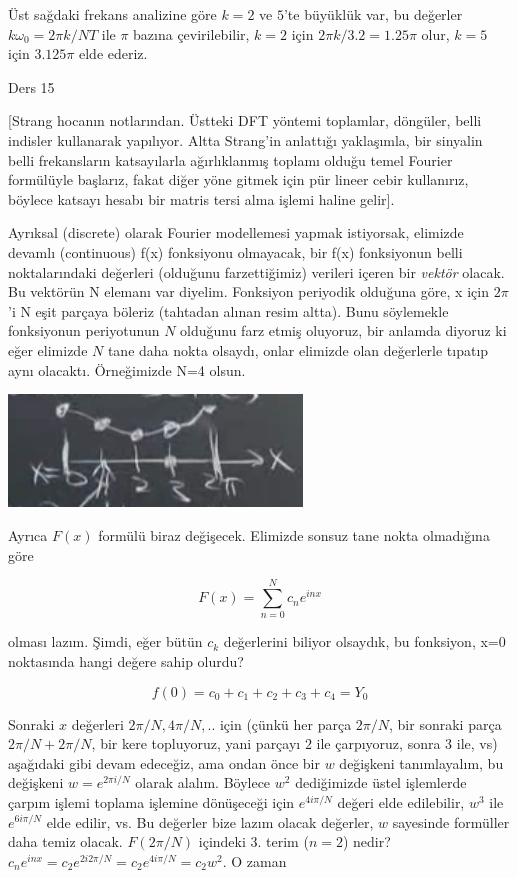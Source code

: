 \documentclass[12pt,fleqn]{article}\usepackage{../../common}
\begin{document}
Üst sağdaki frekans analizine göre $k=2$ ve $5$'te büyüklük var, bu
değerler $k\omega_0 = 2\pi k / NT$ ile $\pi$ bazına çevirilebilir, $k=2$
için $2\pi k / 3.2 = 1.25 \pi$ olur, $k=5$ için $3.125 \pi$ elde ederiz.

Ders 15

[Strang hocanın notlarından. Üstteki DFT yöntemi toplamlar, döngüler, belli
indisler kullanarak yapılıyor. Altta Strang'in anlattığı yaklaşımla, bir
sinyalin belli frekansların katsayılarla ağırlıklanmış toplamı olduğu temel
Fourier formülüyle başlarız, fakat diğer yöne gitmek için pür lineer cebir
kullanırız, böylece katsayı hesabı bir matris tersi alma işlemi haline
gelir].

Ayrıksal (discrete) olarak Fourier modellemesi yapmak istiyorsak, elimizde
devamlı (continuous) f(x) fonksiyonu olmayacak, bir f(x) fonksiyonun belli
noktalarındaki değerleri (olduğunu farzettiğimiz) verileri içeren bir {\em
  vektör} olacak. Bu vektörün N elemanı var diyelim. Fonksiyon periyodik
olduğuna göre, x için $2\pi$'i N eşit parçaya böleriz (tahtadan alınan
resim altta). Bunu söylemekle fonksiyonun periyotunun $N$ olduğunu farz
etmiş oluyoruz, bir anlamda diyoruz ki eğer elimizde $N$ tane daha nokta
olsaydı, onlar elimizde olan değerlerle tıpatıp aynı olacaktı. Örneğimizde
N=4 olsun.

\includegraphics[height=3cm]{compscieng_1_30_01.png}

Ayrıca $F(x)$ formülü biraz değişecek. Elimizde sonsuz tane nokta olmadığına göre

$$ F(x) = \sum_{n=0}^{N} c_ne^{inx} $$

olması lazım. Şimdi, eğer bütün $c_k$ değerlerini biliyor olsaydık, bu
fonksiyon, x=0 noktasında hangi değere sahip olurdu?

$$ f(0) = c_0 + c_1 + c_2 + c_3 + c_4 = Y_0 $$

Sonraki $x$ değerleri $2\pi/N, 4\pi/N, ..$ için (çünkü her parça $2\pi/N$,
bir sonraki parça $2\pi/N + 2\pi/N$, bir kere topluyoruz, yani parçayı $2$
ile çarpıyoruz, sonra $3$ ile, vs) aşağıdaki gibi devam edeceğiz, ama ondan
önce bir $w$ değişkeni tanımlayalım, bu değişkeni $w=e^{2\pi i/N}$ olarak
alalım. Böylece $w^2$ dediğimizde üstel işlemlerde çarpım işlemi toplama
işlemine dönüşeceği için $e^{4i\pi/N}$ değeri elde edilebilir, $w^3$ ile
$e^{6i\pi/N}$ elde edilir, vs. Bu değerler bize lazım olacak değerler, $w$
sayesinde formüller daha temiz olacak. $F(2\pi/N)$ içindeki 3. terim
($n=2$) nedir?  $c_ne^{inx} = c_2e^{2i2\pi/N} = c_2e^{4i\pi/N} = c_2w^2$. O
zaman
\end{document}
